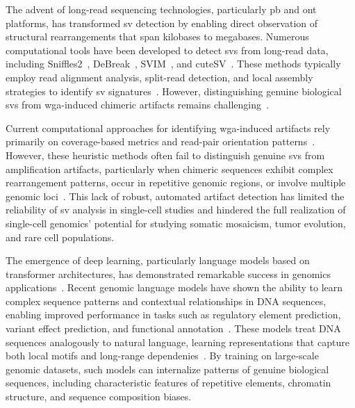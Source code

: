 \documentclass[pdflatex,sn-nature,lineno]{sn-jnl}%
\theoremstyle{thmstyleone}%
\theoremstyle{thmstyletwo}%
\theoremstyle{thmstylethree}%
\begin{document}
The advent of long-read sequencing technologies, particularly \gls{pb} and \gls{ont} platforms, has transformed \gls{sv} detection by enabling direct observation of structural rearrangements that span kilobases to megabases.
Numerous computational tools have been developed to detect \glspl{sv} from long-read data, including
Sniffles2~\cite{Sedlazeck2018,Smolka2024}, DeBreak~\cite{chen2023deciphering}, SVIM~\cite{heller2019svim}, and cuteSV~\cite{jiang2020longreadbased}.
These methods typically employ read alignment analysis, split-read detection, and local assembly strategies to identify \gls{sv} signatures~\cite{alkan2011genome}.
However, distinguishing genuine biological \glspl{sv} from \gls{wga}-induced chimeric artifacts remains challenging~\cite{kiguchi2021longread,lu2023exploration,kosugi2019comprehensive,mahmoud2019structural}.

Current computational approaches for identifying \gls{wga}-induced artifacts rely primarily on coverage-based metrics and read-pair orientation patterns~\cite{kiguchi2021longread, lu2023exploration}.
However, these heuristic methods often fail to distinguish genuine \glspl{sv} from amplification artifacts, particularly when chimeric sequences exhibit complex rearrangement patterns, occur in repetitive genomic regions, or involve multiple genomic loci~\cite{kosugi2019comprehensive,mahmoud2019structural}.
This lack of robust, automated artifact detection has limited the reliability of \gls{sv} analysis in single-cell studies and hindered the full realization of single-cell genomics' potential for studying somatic mosaicism, tumor evolution, and rare cell populations.

The emergence of deep learning, particularly language models based on transformer architectures, has demonstrated remarkable success in genomics applications~\cite{dalla2025nucleotide,zhou2023dnabert,nguyen2023hyenadna, consens2023transformers}.
Recent genomic language models have shown the ability to learn complex sequence patterns and contextual relationships in DNA sequences, enabling improved performance in tasks such as regulatory element prediction, variant effect prediction, and functional annotation~\cite{consens2023transformers,routhier2022genomics,li2024deepchopper}.
These models treat DNA sequences analogously to natural language, learning representations that capture both local motifs and long-range dependenies~\cite{dalla2025nucleotide}.
By training on large-scale genomic datasets, such models can internalize patterns of genuine biological sequences, including characteristic features of repetitive elements, chromatin structure, and sequence composition biases.
\end{document}

